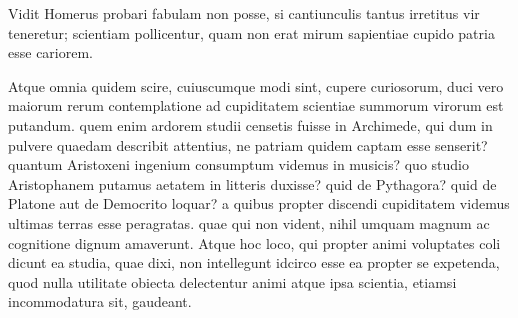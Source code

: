 Vidit Homerus probari fabulam non posse, si cantiunculis tantus irretitus vir teneretur; scientiam pollicentur, quam non erat mirum sapientiae cupido patria esse cariorem. 

Atque omnia quidem scire, cuiuscumque modi sint, cupere curiosorum, duci vero maiorum rerum contemplatione ad cupiditatem scientiae summorum virorum est putandum. quem enim ardorem studii censetis fuisse in Archimede, qui dum in pulvere quaedam describit attentius, ne patriam quidem captam esse senserit? quantum Aristoxeni ingenium consumptum videmus in musicis? quo studio Aristophanem putamus aetatem in litteris duxisse? quid de Pythagora? quid de Platone aut de Democrito loquar? a quibus propter discendi cupiditatem videmus ultimas terras esse peragratas. quae qui non vident, nihil umquam magnum ac cognitione dignum amaverunt. Atque hoc loco, qui propter animi voluptates coli dicunt ea studia, quae dixi, non intellegunt idcirco esse ea propter se expetenda, quod nulla utilitate obiecta delectentur animi atque ipsa scientia, etiamsi incommodatura sit, gaudeant.
